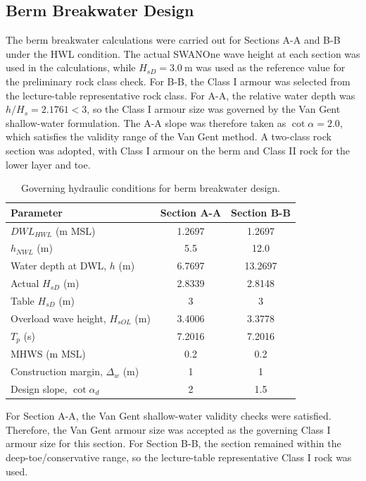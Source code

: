 \documentclass[a4paper, 11pt]{article}
\begin{document}
\subsection{Berm Breakwater Design}

\hspace*{0.5cm} The berm breakwater calculations were carried out for Sections A-A and B-B under the HWL condition. The actual SWANOne wave height at each section was used in the calculations, while \(H_{sD}=3.0~\mathrm{m}\) was used as the reference value for the preliminary rock class check. For B-B, the Class I armour was selected from the lecture-table representative rock class. For A-A, the relative water depth was \(h/H_s=2.1761<3\), so the Class I armour size was governed by the Van Gent shallow-water formulation. The A-A slope was therefore taken as \(\cot\alpha=2.0\), which satisfies the validity range of the Van Gent method. A two-class rock section was adopted, with Class I armour on the berm and Class II rock for the lower layer and toe.

\begin{table}[H]
\centering
\caption{Governing hydraulic conditions for berm breakwater design.}
\label{tab:berm_hydraulic}
\begin{tabular}{l c c}
\hline
Parameter & Section A-A & Section B-B \\
\hline
\(DWL_{HWL}\) (m MSL) & 1.2697 & 1.2697 \\
\(h_{NWL}\) (m) & 5.5 & 12.0 \\
Water depth at DWL, \(h\) (m) & 6.7697 & 13.2697 \\
Actual \(H_{sD}\) (m) & 2.8339 & 2.8148 \\
Table \(H_{sD}\) (m) & 3 & 3 \\
Overload wave height, \(H_{sOL}\) (m) & 3.4006 & 3.3778 \\
\(T_p\) (s) & 7.2016 & 7.2016 \\
MHWS (m MSL) & 0.2 & 0.2 \\
Construction margin, \(\Delta_w\) (m) & 1 & 1 \\
Design slope, \(\cot\alpha_d\) & 2 & 1.5 \\
\hline
\end{tabular}
\end{table}

For Section A-A, the Van Gent shallow-water validity checks were satisfied. Therefore, the Van Gent armour size was accepted as the governing Class I armour size for this section. For Section B-B, the section remained within the deep-toe/conservative range, so the lecture-table representative Class I rock was used.
\end{document}
